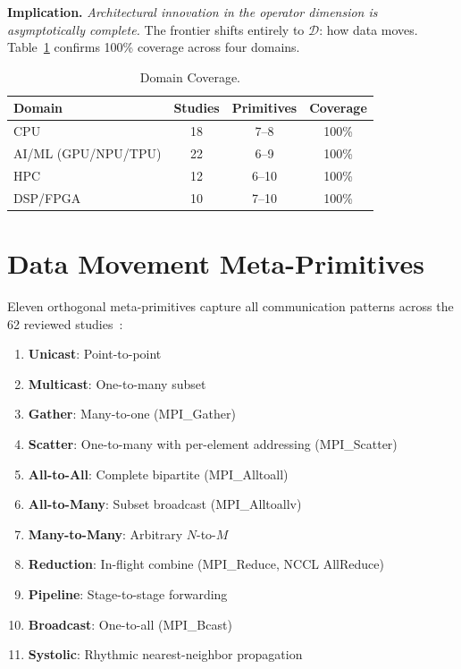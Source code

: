 ﻿\documentclass[review,3p,twocolumn]{elsarticle}
\begin{document}
\textbf{Implication.} \emph{Architectural innovation in the operator dimension is asymptotically complete.} The frontier shifts entirely to $\mathcal{D}$: how data moves. Table~\ref{tab:domains} confirms 100\% coverage across four domains.

\begin{table}[h]
\centering
\caption{Domain Coverage.}
\label{tab:domains}
\begin{tabular}{lccc}
\toprule
\textbf{Domain} & \textbf{Studies} & \textbf{Primitives} & \textbf{Coverage} \\
\midrule
CPU & 18 & 7--8 & 100\% \\
AI/ML (GPU/NPU/TPU) & 22 & 6--9 & 100\% \\
HPC & 12 & 6--10 & 100\% \\
DSP/FPGA & 10 & 7--10 & 100\% \\
\bottomrule
\end{tabular}
\end{table}

\section{Data Movement Meta-Primitives}
\label{sec:datamove}

Eleven orthogonal meta-primitives capture all communication patterns across the 62 reviewed studies~\cite{kung1978}:

\begin{enumerate}
    \item \textbf{Unicast}: Point-to-point
    \item \textbf{Multicast}: One-to-many subset
    \item \textbf{Gather}: Many-to-one (MPI\_Gather)
    \item \textbf{Scatter}: One-to-many with per-element addressing (MPI\_Scatter)
    \item \textbf{All-to-All}: Complete bipartite (MPI\_Alltoall)
    \item \textbf{All-to-Many}: Subset broadcast (MPI\_Alltoallv)
    \item \textbf{Many-to-Many}: Arbitrary $N$-to-$M$
    \item \textbf{Reduction}: In-flight combine (MPI\_Reduce, NCCL AllReduce)
    \item \textbf{Pipeline}: Stage-to-stage forwarding
    \item \textbf{Broadcast}: One-to-all (MPI\_Bcast)
    \item \textbf{Systolic}: Rhythmic nearest-neighbor propagation~\cite{kung1978}
\end{enumerate}
\end{document}
